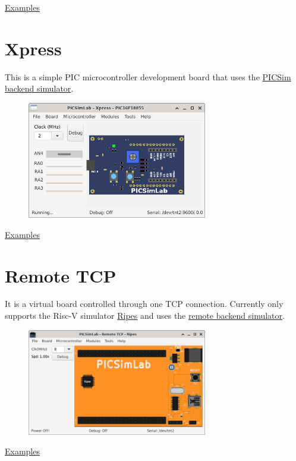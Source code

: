 \href{https://lcgamboa.github.io/picsimlab_examples/board_Curiosity_HPC.html}{Examples}

\section{Xpress}

This is a simple PIC microcontroller development board that uses the
\hyperlink{def:PICSim}{PICSim backend simulator}.

\begin{figure}[H]
\center
\includegraphics[width=0.7\textwidth]{img/Xpress.png} 
\end{figure} 

\href{https://lcgamboa.github.io/picsimlab_examples/board_Xpress.html}{Examples}

\section{Remote TCP}

It is a virtual board controlled through one TCP connection. 
Currently only supports the Risc-V simulator \href{https://github.com/mortbopet/Ripes}{Ripes} and 
uses the \hyperlink{def:remote}{remote backend simulator}.

\begin{figure}[H]
\center
\includegraphics[width=0.7\textwidth]{img/RemoteTCP.png} 
\end{figure} 

\href{https://lcgamboa.github.io/picsimlab_examples/board_Remote_TCP.html}{Examples}


